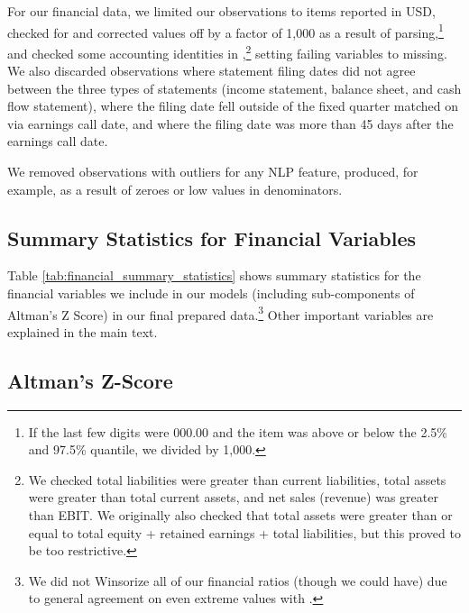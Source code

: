 \documentclass{article}[11pt]
\begin{document}
    For our financial data, we limited our observations to items reported in USD, checked for and corrected values off by a factor of 1,000 as a result of parsing,\footnote{If the last few digits were 000.00 and the item was above or below the 2.5\% and 97.5\% quantile, we divided by 1,000.} and checked some accounting identities in \cite{das_credit_2023},\footnote{We checked total liabilities were greater than current liabilities, total assets were greater than total current assets, and net sales (revenue) was greater than EBIT. We originally also checked that total assets were greater than or equal to total equity + retained earnings + total liabilities, but this proved to be too restrictive.} setting failing variables to missing. We also discarded observations where statement filing dates did not agree between the three types of statements (income statement, balance sheet, and cash flow statement), where the filing date fell outside of the fixed quarter matched on via earnings call date, and where the filing date was more than 45 days after the earnings call date.

    We removed observations with outliers for any NLP feature, produced, for example, as a result of zeroes or low values in denominators.

    \clearpage
    \newpage

    \subsection{Summary Statistics for Financial Variables}

    \label{sec:financial-summary-statistics}

    Table \ref{tab:financial_summary_statistics} shows summary statistics for the financial variables we include in our models (including sub-components of Altman's Z Score) in our final prepared data.\footnote{We did not Winsorize all of our financial ratios (though we could have) due to general agreement on even extreme values with \cite{das_credit_2023}.} Other important variables are explained in the main text.

    

    \clearpage
    \newpage

    \subsection{Altman's Z-Score}
\end{document}
